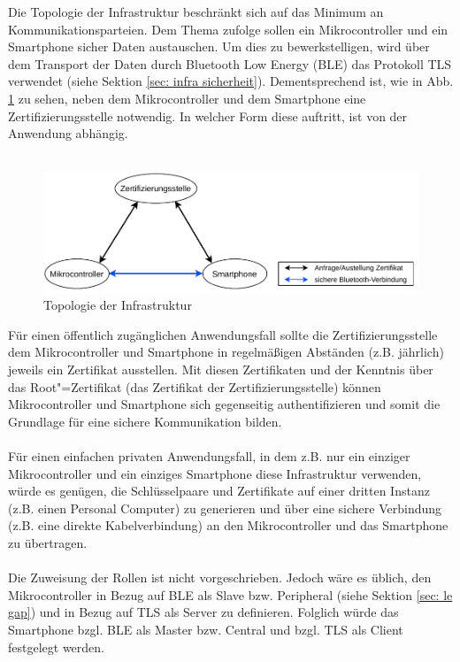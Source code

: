 Die Topologie der Infrastruktur beschränkt sich auf das Minimum an Kommunikationsparteien. Dem Thema zufolge sollen ein Mikrocontroller und ein Smartphone sicher Daten austauschen. Um dies zu bewerkstelligen, wird über dem Transport der Daten durch Bluetooth Low Energy (BLE) das Protokoll TLS verwendet (siehe Sektion \ref{sec: infra sicherheit}). Dementsprechend ist, wie in Abb. \ref{fig: infra topologie} zu sehen, neben dem Mikrocontroller und dem Smartphone eine Zertifizierungsstelle notwendig. In welcher Form diese auftritt, ist von der Anwendung abhängig.
\\\\

\begin{figure}[H]
    \centering
    \includegraphics[width=1\textwidth]{graphics/infra_topologie.pdf}
    \caption[Topologie der Infrastruktur]{Topologie der Infrastruktur}
    \label{fig: infra topologie}
\end{figure}

Für einen öffentlich zugänglichen Anwendungsfall sollte die Zertifizierungsstelle dem Mikrocontroller und Smartphone in regelmäßigen Abständen (z.B. jährlich) jeweils ein Zertifikat ausstellen. Mit diesen Zertifikaten und der Kenntnis über das Root"=Zertifikat (das Zertifikat der Zertifizierungsstelle) können Mikrocontroller und Smartphone sich gegenseitig authentifizieren und somit die Grundlage für eine sichere Kommunikation bilden.
\\\\
Für einen einfachen privaten Anwendungsfall, in dem z.B. nur ein einziger Mikrocontroller und ein einziges Smartphone diese Infrastruktur verwenden, würde es genügen, die Schlüsselpaare und Zertifikate auf einer dritten Instanz (z.B. einen Personal Computer) zu generieren und über eine sichere Verbindung (z.B. eine direkte Kabelverbindung) an den Mikrocontroller und das Smartphone zu übertragen.
\\\\
Die Zuweisung der Rollen ist nicht vorgeschrieben. Jedoch wäre es üblich, den Mikrocontroller in Bezug auf BLE als Slave bzw. Peripheral (siehe Sektion \ref{sec: le gap}) und in Bezug auf TLS als Server zu definieren. Folglich würde das Smartphone bzgl. BLE als Master bzw. Central und bzgl. TLS als Client festgelegt werden.